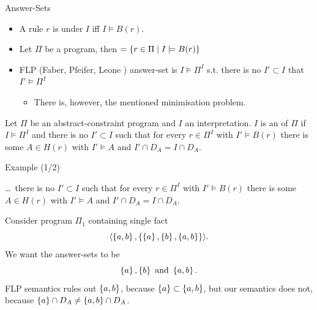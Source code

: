 \documentclass{beamer}
\newcommand{\catom}[2]{\ensuremath{\langle #1, #2 \rangle}}
\begin{document}
\begin{frame}{Answer-Sets}

	\begin{itemize}
		\item A rule $r$ is \emph{} under $I$ iff $I \models B(r)$.
		\item Let $\Pi$ be a program, then  $= \{r \in \Pi \mid I \models B(r)\}$
		\item FLP (Faber, Pfeifer, Leone \cite{FPL}) answer-set is $I \models \Pi^I$ s.t.\newline
		there is no $I' \subset I$ that $I' \models \Pi^I$
		\pause
		\begin{itemize}
			\item There is, however, the mentioned minimisation problem. %
		\end{itemize}
	\end{itemize}

	\pause

	\begin{definition}
	Let $\Pi$ be an abstract-constraint program and $I$ an interpretation.\newline
	\pause
	$I$ is an \emph{} of $\Pi$ if $I \models \Pi^I$ and there is no $I' \subset I$ such that\newline
	\pause
	for every $r \in \Pi^I$ with $I' \models B(r)$ there is some $A \in H(r)$ with
	$I' \models A$ and $I' \cap D_A = I \cap D_A$.
	\end{definition}

\end{frame}

\begin{frame}{Example (1/2)}

	\ldots\ there is no $I' \subset I$ such that for every $r \in \Pi^I$ with $I' \models B(r)$ there is some $A \in H(r)$ with
	$I' \models A$ and $I' \cap D_A = I \cap D_A$.

	\begin{example}[1]
	Consider program $\Pi_1$ containing single fact
	$$\catom{\set{a,b}}{\set{\set{a}, \set{b}, \set{a,b}}}.$$
	We want the answer-sets to be
	$$\left\{{a}\right\}, \left\{{b}\right\} \text{ and } \left\{{a,b}\right\}.$$
	FLP semantics rules out $\left\{{a,b}\right\}$, because $\left\{{a}\right\} \subset \left\{{a,b}\right\}$, but\newline
	our semantics does not, because $\left\{{a}\right\} \cap D_A \neq \left\{{a,b}\right\} \cap D_A$.
	\end{example}

\end{frame}
\end{document}
